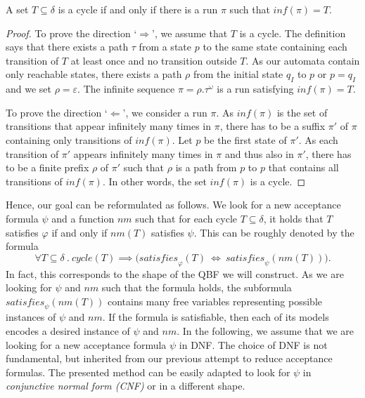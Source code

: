\documentclass[a4paper,UKenglish,cleveref,autoref,thm-restate]{lipics-v2021}
\newcommand{\minf}{\mathit{inf}}
\newcommand{\rem}{\mathit{nm}}
\newcommand{\mcycle}{\mathit{cycle}}
\newcommand{\msat}{\mathit{satisfies}}
\begin{document}
\begin{lemma}
  A set $T\subseteq\delta$ is a cycle if and only if
  there is a run $\pi$ such that $\minf(\pi)=T$.
\end{lemma}
\begin{proof}
  To prove the direction `$\Longrightarrow$', we assume that $T$ is a
  cycle. The definition says that there exists a path $\tau$ from a
  state $p$ to the same state containing each transition of $T$ at
  least once and no transition outside $T$. As our automata contain
  only reachable states, there exists a path $\rho$ from the initial
  state $q_I$ to $p$ or $p=q_I$ and we set $\rho=\varepsilon$. The
  infinite sequence $\pi=\rho.\tau^\omega$ is a run satisfying
  $\minf(\pi)=T$.

  To prove the direction `$\Longleftarrow$', we consider a run
  $\pi$.  As $\minf(\pi)$ is the set of transitions that appear
  infinitely many times in $\pi$, there has to be a suffix $\pi'$ of
  $\pi$ containing only transitions of $\minf(\pi)$. Let $p$ be the
  first state of $\pi'$. As each transition of $\pi'$ appears
  infinitely many times in $\pi$ and thus also in $\pi'$, there has to
  be a finite prefix $\rho$ of $\pi'$ such that $\rho$ is a path from
  $p$ to $p$ that contains all transitions of $\minf(\pi)$. In other
  words, the set $\minf(\pi)$ is a cycle.
\end{proof}

Hence, our goal can be reformulated as follows. We look for a new
acceptance formula $\psi$ and a function $\rem$ such that for each
cycle $T\subseteq\delta$, it holds that $T$ satisfies $\varphi$ if and
only if $\rem(T)$ satisfies $\psi$. This can be roughly denoted by the
formula
\[
  \forall T\subseteq\delta~.~\mcycle(T)\implies\big(\msat_\varphi(T) ~\iff~ \msat_{\psi}(\rem(T))\big).
\]
In fact, this corresponds to the shape of the QBF we will
construct. As we are looking for $\psi$ and $\rem$ such that the
formula holds, the subformula $\msat_{\psi}(\rem(T))$ contains many
free variables representing possible instances of $\psi$ and
$\rem$. If the formula is satisfiable, then each of its models encodes
a desired instance of $\psi$ and $\rem$. In the following, we assume
that we are looking for a new acceptance formula $\psi$ in DNF. The
choice of DNF is not fundamental, but inherited from our previous
attempt to reduce acceptance formulas. The presented method can be
easily adapted to look for $\psi$ in \emph{conjunctive normal form
  (CNF)} or in a different shape.
\end{document}
